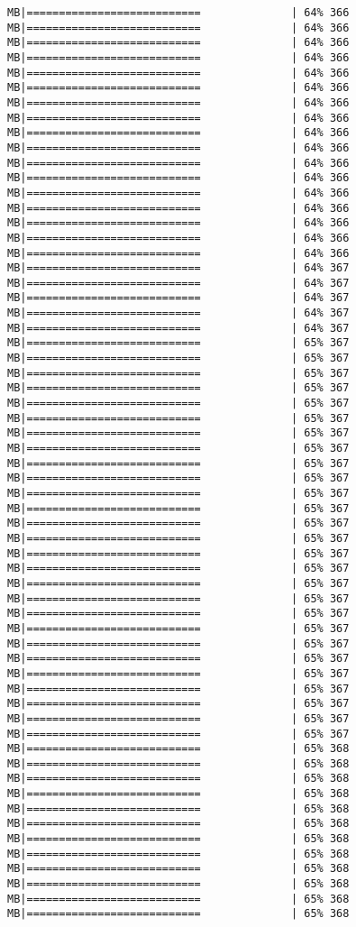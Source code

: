 \documentclass[
]{article}
\begin{document}
\begin{verbatim}
MB|===========================              | 64% 366 MB|===========================              | 64% 366 MB|===========================              | 64% 366 MB|===========================              | 64% 366 MB|===========================              | 64% 366 MB|===========================              | 64% 366 MB|===========================              | 64% 366 MB|===========================              | 64% 366 MB|===========================              | 64% 366 MB|===========================              | 64% 366 MB|===========================              | 64% 366 MB|===========================              | 64% 366 MB|===========================              | 64% 366 MB|===========================              | 64% 366 MB|===========================              | 64% 366 MB|===========================              | 64% 366 MB|===========================              | 64% 366 MB|===========================              | 64% 367 MB|===========================              | 64% 367 MB|===========================              | 64% 367 MB|===========================              | 64% 367 MB|===========================              | 64% 367 MB|===========================              | 65% 367 MB|===========================              | 65% 367 MB|===========================              | 65% 367 MB|===========================              | 65% 367 MB|===========================              | 65% 367 MB|===========================              | 65% 367 MB|===========================              | 65% 367 MB|===========================              | 65% 367 MB|===========================              | 65% 367 MB|===========================              | 65% 367 MB|===========================              | 65% 367 MB|===========================              | 65% 367 MB|===========================              | 65% 367 MB|===========================              | 65% 367 MB|===========================              | 65% 367 MB|===========================              | 65% 367 MB|===========================              | 65% 367 MB|===========================              | 65% 367 MB|===========================              | 65% 367 MB|===========================              | 65% 367 MB|===========================              | 65% 367 MB|===========================              | 65% 367 MB|===========================              | 65% 367 MB|===========================              | 65% 367 MB|===========================              | 65% 367 MB|===========================              | 65% 367 MB|===========================              | 65% 367 MB|===========================              | 65% 368 MB|===========================              | 65% 368 MB|===========================              | 65% 368 MB|===========================              | 65% 368 MB|===========================              | 65% 368 MB|===========================              | 65% 368 MB|===========================              | 65% 368 MB|===========================              | 65% 368 MB|===========================              | 65% 368 MB|===========================              | 65% 368 MB|===========================              | 65% 368 MB|===========================              | 65% 368 
\end{verbatim}
\end{document}
